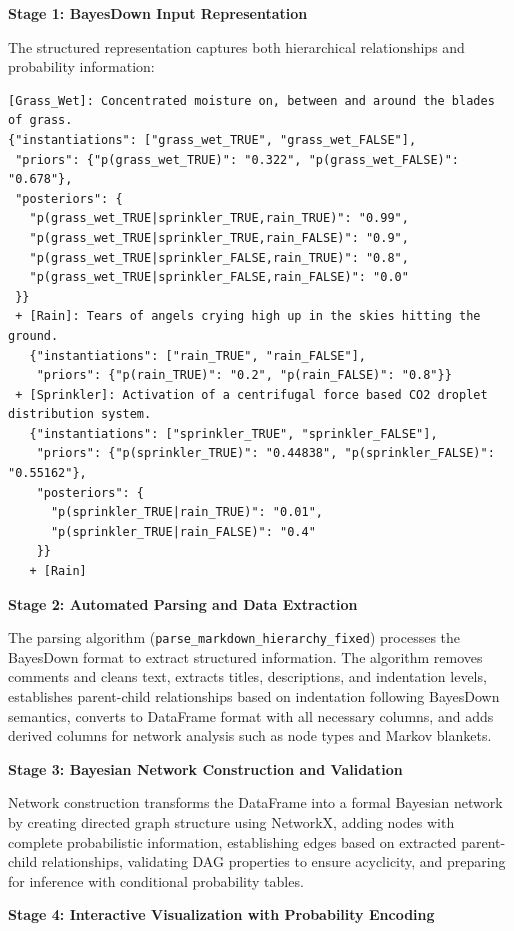 \documentclass[
  11pt,
  letterpaper,
]{book}
\begin{document}
\textbf{Stage 1: BayesDown Input Representation}

The structured representation captures both hierarchical relationships
and probability information:

\begin{verbatim}
[Grass_Wet]: Concentrated moisture on, between and around the blades of grass. 
{"instantiations": ["grass_wet_TRUE", "grass_wet_FALSE"], 
 "priors": {"p(grass_wet_TRUE)": "0.322", "p(grass_wet_FALSE)": "0.678"},
 "posteriors": {
   "p(grass_wet_TRUE|sprinkler_TRUE,rain_TRUE)": "0.99",
   "p(grass_wet_TRUE|sprinkler_TRUE,rain_FALSE)": "0.9",
   "p(grass_wet_TRUE|sprinkler_FALSE,rain_TRUE)": "0.8", 
   "p(grass_wet_TRUE|sprinkler_FALSE,rain_FALSE)": "0.0"
 }}
 + [Rain]: Tears of angels crying high up in the skies hitting the ground.
   {"instantiations": ["rain_TRUE", "rain_FALSE"],
    "priors": {"p(rain_TRUE)": "0.2", "p(rain_FALSE)": "0.8"}}
 + [Sprinkler]: Activation of a centrifugal force based CO2 droplet distribution system.
   {"instantiations": ["sprinkler_TRUE", "sprinkler_FALSE"], 
    "priors": {"p(sprinkler_TRUE)": "0.44838", "p(sprinkler_FALSE)": "0.55162"},
    "posteriors": {
      "p(sprinkler_TRUE|rain_TRUE)": "0.01",
      "p(sprinkler_TRUE|rain_FALSE)": "0.4"
    }}
   + [Rain]
\end{verbatim}

\textbf{Stage 2: Automated Parsing and Data Extraction}

The parsing algorithm (\texttt{parse\_markdown\_hierarchy\_fixed})
processes the BayesDown format to extract structured information. The
algorithm removes comments and cleans text, extracts titles,
descriptions, and indentation levels, establishes parent-child
relationships based on indentation following BayesDown semantics,
converts to DataFrame format with all necessary columns, and adds
derived columns for network analysis such as node types and Markov
blankets.

\textbf{Stage 3: Bayesian Network Construction and Validation}

Network construction transforms the DataFrame into a formal Bayesian
network by creating directed graph structure using NetworkX, adding
nodes with complete probabilistic information, establishing edges based
on extracted parent-child relationships, validating DAG properties to
ensure acyclicity, and preparing for inference with conditional
probability tables.

\textbf{Stage 4: Interactive Visualization with Probability Encoding}
\end{document}

